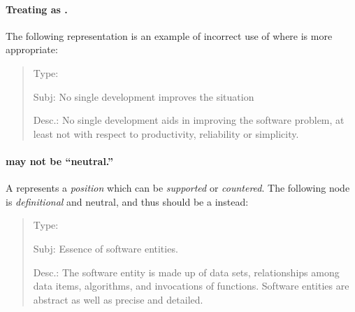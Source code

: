 \paragraph{Treating  as .}

The following representation is an example of incorrect use of  where  is more appropriate:

\small
\begin{quote}
 \begin{itemizenoindent}

   \item {\sf Type}: 
 
   \item {\sf Subj}: No single development improves the situation
 
   \item {\sf Desc.}: No single development aids in improving the software
     problem, at least not with respect to productivity, reliability or
     simplicity.

 \end{itemizenoindent}
\end{quote}
\normalsize
{}


\paragraph{ may not be ``neutral.''}

A  represents a {\it position\/} which can be {\it
supported\/} or {\it countered\/}. The following node is {\it
definitional\/} and neutral, and thus should be a 
instead:

\small
\begin{quote}
 \begin{itemizenoindent}
 \item {\sf Type}: 
 
\item {\sf Subj}: Essence of software entities.
 
\item {\sf Desc.}: The software entity is made up of data sets,
  relationships among data items, algorithms, and invocations of functions.
  Software entities are abstract as well as precise and detailed.
 \end{itemizenoindent}
\end{quote}
\normalsize
{}


